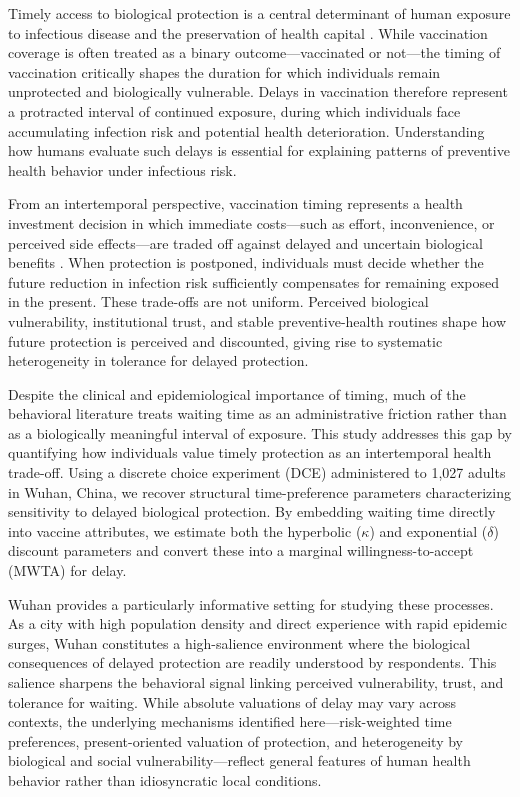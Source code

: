 \documentclass[12pt]{article}
\begin{document}
Timely access to biological protection is a central determinant of human exposure to 
infectious disease and the preservation of health capital \citep{grossman1972concept, 
becker1964human}. While vaccination coverage is often treated as a binary outcome---vaccinated 
or not---the timing of vaccination critically shapes the duration for which individuals 
remain unprotected and biologically vulnerable. Delays in vaccination therefore represent a 
protracted interval of continued exposure, during which individuals face accumulating 
infection risk and potential health deterioration. Understanding how humans evaluate such 
delays is essential for explaining patterns of preventive health behavior under infectious 
risk.

From an intertemporal perspective, vaccination timing represents a health investment decision 
in which immediate costs---such as effort, inconvenience, or perceived side effects---are 
traded off against delayed and uncertain biological benefits \citep{cropper1977health}. 
When protection is postponed, individuals must decide whether the future reduction in 
infection risk sufficiently compensates for remaining exposed in the present. These 
trade-offs are not uniform. Perceived biological vulnerability, institutional trust, and 
stable preventive-health routines shape how future protection is perceived and discounted, 
giving rise to systematic heterogeneity in tolerance for delayed protection.

Despite the clinical and epidemiological importance of timing, much of the behavioral 
literature treats waiting time as an administrative friction rather than as a biologically 
meaningful interval of exposure. This study addresses this gap by quantifying how individuals 
value timely protection as an intertemporal health trade-off. Using a discrete choice 
experiment (DCE) administered to 1,027 adults in Wuhan, China, we recover structural 
time-preference parameters characterizing sensitivity to delayed biological protection. 
By embedding waiting time directly into vaccine attributes, we estimate both the hyperbolic 
($\kappa$) and exponential ($\delta$) discount parameters and convert these into a marginal 
willingness-to-accept (MWTA) for delay.

Wuhan provides a particularly informative setting for studying these processes. As a city 
with high population density and direct experience with rapid epidemic surges, Wuhan 
constitutes a high-salience environment where the biological consequences of delayed 
protection are readily understood by respondents. This salience sharpens the behavioral 
signal linking perceived vulnerability, trust, and tolerance for waiting. While absolute 
valuations of delay may vary across contexts, the underlying mechanisms identified 
here---risk-weighted time preferences, present-oriented valuation of protection, and 
heterogeneity by biological and social vulnerability---reflect general features of human 
health behavior rather than idiosyncratic local conditions.
\end{document}
